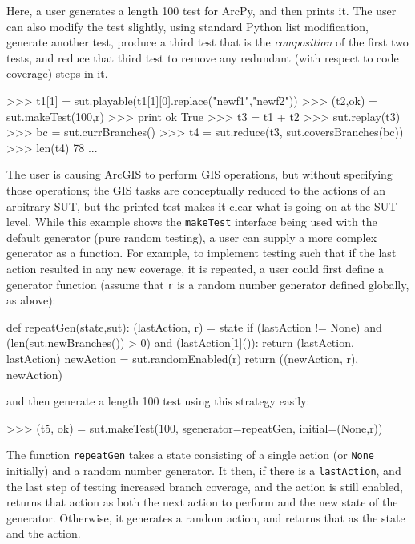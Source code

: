 Here, a user generates a length 100 test for ArcPy, and then prints it.  The user can also modify the test slightly, using standard Python list modification, generate another test, produce a third test that is the \emph{composition} of the first two tests, and reduce that third test to remove any redundant (with respect to code coverage) steps in it.

{\scriptsize
\begin{code}
 >>> t1[1] = sut.playable(t1[1][0].replace("newf1","newf2"))
 >>> (t2,ok) = sut.makeTest(100,r)
 >>> print ok
 True
 >>> t3 = t1 + t2
 >>> sut.replay(t3)
 >>> bc = sut.currBranches()
 >>> t4 = sut.reduce(t3, sut.coversBranches(bc))
 >>> len(t4)
 78
...
\end{code}
}

The user is causing ArcGIS to perform GIS operations, but without specifying those operations; the GIS tasks are conceptually reduced to the actions of an arbitrary SUT, but the printed test makes it clear what is going on at the SUT level.  While this example shows the {\tt makeTest} interface being used with the default generator (pure random testing), a user can supply a more complex generator as a function.  For example, to implement testing such that if the last action resulted in any new coverage, it is repeated, a user could first
define a generator function (assume that {\tt r} is a random number generator defined globally, as above):

{\scriptsize
\begin{code}
def repeatGen(state,sut):
   (lastAction, r) = state
   if (lastAction != None) and (len(sut.newBranches()) > 0) and (lastAction[1]()):
      return (lastAction, lastAction)
   newAction = sut.randomEnabled(r)
   return ((newAction, r), newAction)
\end{code}
}
and then generate a length 100 test using this strategy easily:
{\scriptsize
\begin{code}
 >>> (t5, ok) = sut.makeTest(100, sgenerator=repeatGen, initial=(None,r))
\end{code}
}

The function {\tt repeatGen} takes a state consisting of a single action (or {\tt None} initially) and a random number generator.  It then, if there is a {\tt lastAction}, and the last step of testing increased branch coverage, and the action is still enabled, returns that action as both the next action to perform and the new state of the generator.  Otherwise, it generates a random action, and returns that as the state and the action.

